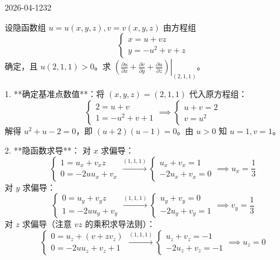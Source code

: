 \begin{mistake}{2026-04-12}{32}

\begin{problemcontent}
设隐函数组 \( u=u(x,y,z), v=v(x,y,z) \) 由方程组
\[ \begin{cases} x=u+vz \\ y=-u^2+v+z \end{cases} \]
确定，且 \( u(2,1,1)>0 \)。求 \( \left.\left(\frac{\partial u}{\partial x}+\frac{\partial v}{\partial y}+\frac{\partial u}{\partial z}\right)\right|_{(2,1,1)} \)。
\end{problemcontent}

\begin{solutioncontent}
1. **确定基准点数值**：将 \( (x,y,z)=(2,1,1) \) 代入原方程组：
\[ \begin{cases} 2 = u+v \\ 1 = -u^2+v+1 \end{cases} \implies \begin{cases} u+v=2 \\ v=u^2 \end{cases} \]
解得 \( u^2+u-2=0 \)，即 \( (u+2)(u-1)=0 \)。由 \( u>0 \) 知 \( u=1, v=1 \)。

2. **隐函数求导**：
对 \( x \) 求偏导：
\[ \begin{cases} 1 = u_x + v_x z \\ 0 = -2uu_x + v_x \end{cases} \xrightarrow{(1,1,1)} \begin{cases} u_x + v_x = 1 \\ -2u_x + v_x = 0 \end{cases} \implies u_x = \frac{1}{3} \]
对 \( y \) 求偏导：
\[ \begin{cases} 0 = u_y + v_y z \\ 1 = -2uu_y + v_y \end{cases} \xrightarrow{(1,1,1)} \begin{cases} u_y + v_y = 0 \\ -2u_y + v_y = 1 \end{cases} \implies v_y = \frac{1}{3} \]
对 \( z \) 求偏导（注意 \( vz \) 的乘积求导法则）：
\[ \begin{cases} 0 = u_z + (v + zv_z) \\ 0 = -2uu_z + v_z + 1 \end{cases} \xrightarrow{(1,1,1)} \begin{cases} u_z + v_z = -1 \\ -2u_z + v_z = -1 \end{cases} \implies u_z = 0 \]


\end{solutioncontent}
\end{mistake}
